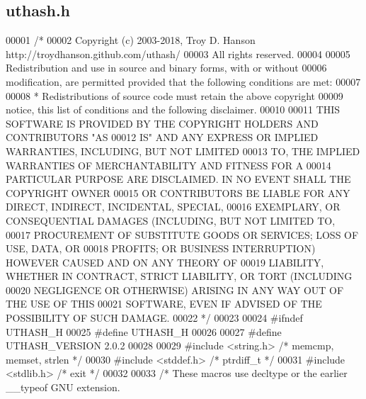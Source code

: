 \hypertarget{uthash_8h_source}{}\subsection{uthash.\+h}

\begin{DoxyCode}
00001 \textcolor{comment}{/*}
00002 \textcolor{comment}{Copyright (c) 2003-2018, Troy D. Hanson     http://troydhanson.github.com/uthash/}
00003 \textcolor{comment}{All rights reserved.}
00004 \textcolor{comment}{}
00005 \textcolor{comment}{Redistribution and use in source and binary forms, with or without}
00006 \textcolor{comment}{modification, are permitted provided that the following conditions are met:}
00007 \textcolor{comment}{}
00008 \textcolor{comment}{    * Redistributions of source code must retain the above copyright}
00009 \textcolor{comment}{      notice, this list of conditions and the following disclaimer.}
00010 \textcolor{comment}{}
00011 \textcolor{comment}{THIS SOFTWARE IS PROVIDED BY THE COPYRIGHT HOLDERS AND CONTRIBUTORS "AS}
00012 \textcolor{comment}{IS" AND ANY EXPRESS OR IMPLIED WARRANTIES, INCLUDING, BUT NOT LIMITED}
00013 \textcolor{comment}{TO, THE IMPLIED WARRANTIES OF MERCHANTABILITY AND FITNESS FOR A}
00014 \textcolor{comment}{PARTICULAR PURPOSE ARE DISCLAIMED. IN NO EVENT SHALL THE COPYRIGHT OWNER}
00015 \textcolor{comment}{OR CONTRIBUTORS BE LIABLE FOR ANY DIRECT, INDIRECT, INCIDENTAL, SPECIAL,}
00016 \textcolor{comment}{EXEMPLARY, OR CONSEQUENTIAL DAMAGES (INCLUDING, BUT NOT LIMITED TO,}
00017 \textcolor{comment}{PROCUREMENT OF SUBSTITUTE GOODS OR SERVICES; LOSS OF USE, DATA, OR}
00018 \textcolor{comment}{PROFITS; OR BUSINESS INTERRUPTION) HOWEVER CAUSED AND ON ANY THEORY OF}
00019 \textcolor{comment}{LIABILITY, WHETHER IN CONTRACT, STRICT LIABILITY, OR TORT (INCLUDING}
00020 \textcolor{comment}{NEGLIGENCE OR OTHERWISE) ARISING IN ANY WAY OUT OF THE USE OF THIS}
00021 \textcolor{comment}{SOFTWARE, EVEN IF ADVISED OF THE POSSIBILITY OF SUCH DAMAGE.}
00022 \textcolor{comment}{*/}
00023 
00024 \textcolor{preprocessor}{#ifndef UTHASH\_H}
00025 \textcolor{preprocessor}{#define UTHASH\_H}
00026 
00027 \textcolor{preprocessor}{#define UTHASH\_VERSION 2.0.2}
00028 
00029 \textcolor{preprocessor}{#include <string.h>}   \textcolor{comment}{/* memcmp, memset, strlen */}
00030 \textcolor{preprocessor}{#include <stddef.h>}   \textcolor{comment}{/* ptrdiff\_t */}
00031 \textcolor{preprocessor}{#include <stdlib.h>}   \textcolor{comment}{/* exit */}
00032 
00033 \textcolor{comment}{/* These macros use decltype or the earlier \_\_typeof GNU extension.}

\end{DoxyCode}

